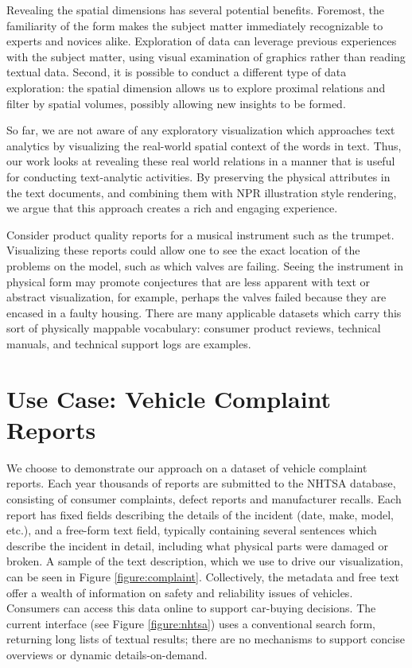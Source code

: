 Revealing the spatial dimensions has several potential benefits. Foremost, the
familiarity of the form makes the subject matter immediately recognizable
to experts and novices alike. Exploration of data can leverage previous 
experiences with the subject matter, using visual examination of graphics 
rather than reading textual data. Second, it is possible to conduct a different
type of data exploration: the spatial dimension allows us to explore
proximal relations and filter by spatial volumes, possibly allowing
new insights to be formed.

So far, we are not aware of any exploratory visualization which approaches text
analytics by visualizing the real-world spatial context of the words in
text. Thus, our work looks at revealing these real world relations in a manner
that is useful for conducting text-analytic activities. By preserving the physical
attributes in the text documents, and combining them with NPR illustration style 
rendering, we argue that this approach creates a rich and engaging experience.

Consider product quality reports for a musical instrument such as the trumpet.
Visualizing these reports could allow one to see the exact location of the problems on the
\threed model, such as which valves are failing. Seeing the instrument
in physical form may promote conjectures that are less apparent
with text or abstract visualization, for example, perhaps the valves
failed because they are encased in a faulty housing. There are many
applicable datasets which carry this sort of physically mappable vocabulary:
consumer product reviews, technical manuals, and technical
support logs are examples.
 


\section{Use Case: Vehicle Complaint Reports}
We choose to demonstrate our approach on a dataset of vehicle complaint
reports. Each year thousands of reports are submitted to the
NHTSA database, consisting of consumer complaints, defect reports
and manufacturer recalls. Each report has fixed fields describing the
details of the incident (date, make, model, etc.), and a free-form text
field, typically containing several sentences which describe the incident
in detail, including what physical parts were damaged or broken. A sample of the
text description, which we use to drive our visualization, can be seen in Figure
\ref{figure:complaint}.  Collectively, the metadata and free
text offer a wealth of information on safety and reliability issues of
vehicles. Consumers can access this data online to support car-buying
decisions. The current interface (see Figure \ref{figure:nhtsa}) uses a
conventional search form, returning long lists of textual results; there are no mechanisms to support
concise overviews or dynamic details-on-demand. 

